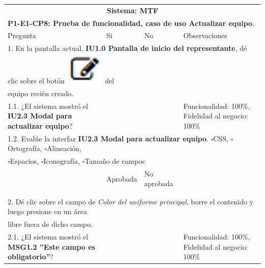 \documentclass[oneside,10pt]{book}
\begin{document}
\begin{tabularx}{\textwidth}{ X l l X }
\multicolumn{4}{c}{\cellcolor[HTML]{9B9B9B}\textbf{Sistema: MTF}}                                                                                     \\
\multicolumn{4}{l}{\cellcolor[HTML]{EFEFEF}\textbf{P1-E1-CP8: Prueba de funcionalidad, caso de uso Actualizar equipo}.}                                                   \\ \hline
\multicolumn{1}{|X|}{Pregunta}                               & \multicolumn{1}{l|}{Si} & \multicolumn{1}{l|}{No} & \multicolumn{1}{X|}{Observaciones} \\ \hline

\multicolumn{4}{|l|}{1. En la pantalla actual, \textbf{IU1.0 Pantalla de inicio del representante}, dé clic sobre el botón \includegraphics[scale=.3]{images/edit} del}              \\
\multicolumn{4}{|l|}{equipo recién creado.} \\ \hline
\multicolumn{1}{|X|}{1.1. ¿El sistema mostró el \textbf{IU2.3 Modal para actualizar equipo}?} & \multicolumn{1}{l|}{}   & \multicolumn{1}{l|}{}   & \multicolumn{1}{X|}{Funcionalidad: 100\%, Fidelidad al negocio: 100\%}              \\ \hline
\multicolumn{4}{|l|}{1.2. Evalúe la interfaz \textbf{IU2.3 Modal para actualizar equipo}. $\square$CSS, $\square$Ortografía, $\square$Alineación,}                        \\
\multicolumn{4}{|l|}{$\square$Espacios, $\square$Iconografía, $\square$Tamaño de campos}                        \\ \hline
\multicolumn{1}{|l|}{ }	& \multicolumn{1}{l|}{Aprobada} & \multicolumn{1}{l|}{No aprobada} & \multicolumn{1}{l|}{ } \\ \hline
\multicolumn{1}{|l|}{ } & \multicolumn{1}{l|}{ } & \multicolumn{1}{l|}{ } & \multicolumn{1}{l|}{ } \\
\multicolumn{1}{|l|}{ } & \multicolumn{1}{l|}{ } & \multicolumn{1}{l|}{ } & \multicolumn{1}{l|}{ } \\ \hline

\multicolumn{4}{|l|}{2. Dé clic sobre el campo de \textit{Color del uniforme principal}, borre el contenido y luego presione en un área}              \\
\multicolumn{4}{|l|}{libre fuera de dicho campo.}              \\ \hline
\multicolumn{1}{|X|}{2.1. ¿El sistema mostró el \textbf{MSG1.2 ''Este campo es obligatorio''}?} & \multicolumn{1}{l|}{}   & \multicolumn{1}{l|}{}   & \multicolumn{1}{X|}{Funcionalidad: 100\%, Fidelidad al negocio: 100\%}              \\ \hline


\end{tabularx}
\end{document}
